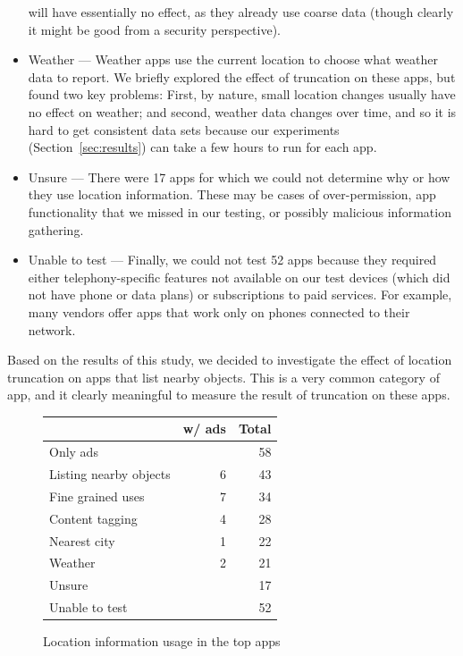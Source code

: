 \documentclass[10pt, conference, compsocconf]{IEEEtran}
\newcommand{\numinvestigatedapps}{750\xspace}
\newcommand{\numappsusinglocation}{275\xspace}
\newcommand{\numappsweather}{21\xspace}
\newcommand{\numappsnearbycities}{22\xspace}
\newcommand{\numappsunsure}{17\xspace}
\newcommand{\numappsads}{78\xspace}
\newcommand{\numappsonlyads}{58\xspace}
\newcommand{\numappslist}{43\xspace}
\newcommand{\numappslistads}{6\xspace}
\newcommand{\numappstagging}{28\xspace}
\newcommand{\numappsfinegrained}{34\xspace}
\newcommand{\numappsfinegrainedads}{7\xspace}
\newcommand{\numappstaggingads}{4\xspace}
\newcommand{\numappsweatherads}{2\xspace}
\newcommand{\numappsnottestable}{52\xspace}
\newcommand{\numappsnearbycitiesads}{1\xspace}
\begin{document}
\begin{itemize}
  will have essentially no effect, as they already use coarse data
  (though clearly it might be good from a security perspective).
\item Weather --- Weather apps use the current location to choose
  what weather data to report. We briefly explored the effect of
  truncation on these apps, but found two key problems: First, by
  nature, small
  location changes usually have no effect on weather; and second, weather data changes
  over time, and so it is hard to get consistent data sets because
  our experiments (Section~\ref{sec:results}) can take a few hours
  to run for each app.
\item Unsure --- There were 17 apps for which we could not determine
  why or how they use location information. These may be cases of
  over-permission, app functionality that we missed in our testing,
  or possibly malicious information gathering.
\item Unable to test --- Finally, we could not test 52 apps because
  they required either telephony-specific features not available on
  our test devices (which did not have phone or data plans) or
  subscriptions to paid services.  For example, many vendors offer
  apps that work only on phones connected to their network.
\end{itemize}

Based on the results of this study, we decided to investigate the
effect of location truncation on apps that list nearby objects. This
is a very common category of app, and it
clearly meaningful to measure the result of truncation on these apps.

\begin{figure}
  \small
  \centering
  \begin{tabular}{|l|rr|}
    \hline
    &
    w/ ads & Total
    \\
    \hline \hline
    Only ads & & \numappsonlyads \\
    \hline
    Listing nearby objects & \numappslistads & \numappslist \\
    \hline
    Fine grained uses & \numappsfinegrainedads & \numappsfinegrained \\
    \hline
    Content tagging & \numappstaggingads & \numappstagging \\
    \hline
    Nearest city & \numappsnearbycitiesads & \numappsnearbycities \\
    \hline
    Weather & \numappsweatherads & \numappsweather \\
    \hline
    Unsure & & \numappsunsure \\
    \hline
    Unable to test & & \numappsnottestable \\
    \hline
  \end{tabular}
  \caption{Location information usage in the top apps}
  \label{fig:location-uses}
\end{figure}
\end{document}
